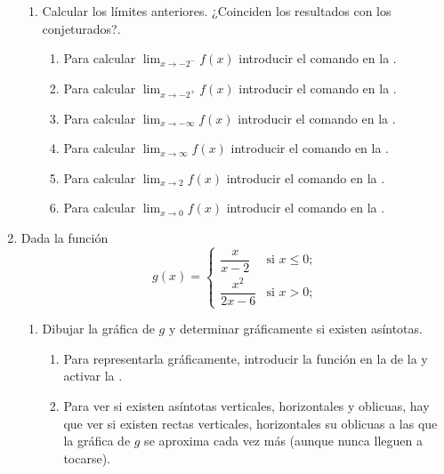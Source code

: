 \begin{enumerate}[leftmargin=*]
\begin{enumerate}
      \item Calcular los límites anteriores. ¿Coinciden los resultados con los conjeturados?.
            \begin{indication}
            \begin{enumerate}
            \item Para calcular $\lim_{x\rightarrow -2^-} f(x)$ introducir el comando  en la .
            \item Para calcular $\lim_{x\rightarrow -2^+} f(x)$ introducir el comando  en la .
            \item Para calcular $\lim_{x\rightarrow -\infty} f(x)$ introducir el comando  en la .
            \item Para calcular $\lim_{x\rightarrow \infty} f(x)$ introducir el comando  en la .
            \item Para calcular $\lim_{x\rightarrow 2} f(x)$ introducir el comando  en la .
            \item Para calcular $\lim_{x\rightarrow 0} f(x)$ introducir el comando  en la .
            \end{enumerate}
            \end{indication}
      \end{enumerate}

\item Dada la función
      \[
      g(x)=
      \begin{cases}
      \dfrac{x}{x-2}    & \mbox{si $x\leq 0$;} \\
      \dfrac{x^2}{2x-6} & \mbox{si $x>0$;}
      \end{cases}
      \]
      \begin{enumerate}
      \item Dibujar la gráfica de $g$ y determinar gráficamente si existen asíntotas.
            \begin{indication}
            \begin{enumerate}
            \item Para representarla gráficamente, introducir la función  en la  de la  y activar la .
            \item Para ver si existen asíntotas verticales, horizontales y oblicuas, hay que ver si existen rectas verticales, horizontales su oblicuas a las que la gráfica de $g$ se aproxima cada vez más (aunque nunca lleguen a tocarse).
            \end{enumerate}
            \end{indication}


\end{enumerate}
\end{enumerate}
